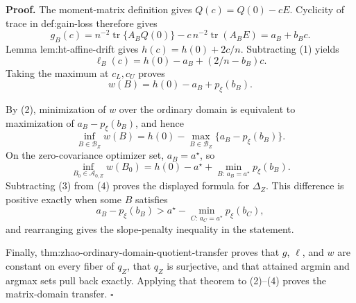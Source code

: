 \textbf{Proof.}
The moment-matrix definition gives \(Q(c)=Q(0)-cE\).  Cyclicity of trace in def:gain-loss therefore gives
\[
g_B(c)=n^{-2}\operatorname{tr}\{A_BQ(0)\}
-c\,n^{-2}\operatorname{tr}(A_BE)=a_B+b_Bc. \tag{1}
\]
Lemma lem:ht-affine-drift gives \(h(c)=h(0)+2c/n\).  Subtracting (1) yields
\[
\ell_B(c)=h(0)-a_B+(2/n-b_B)c.
\]
Taking the maximum at \(c_L,c_U\) proves
\[
w(B)=h(0)-a_B+p_\xi(b_B). \tag{2}
\]

By (2), minimization of \(w\) over the ordinary domain is equivalent to maximization of \(a_B-p_\xi(b_B)\), and hence
\[
\inf_{B\in\mathcal B_Z}w(B)
=h(0)-\max_{B\in\mathcal B_Z}\{a_B-p_\xi(b_B)\}. \tag{3}
\]
On the zero-covariance optimizer set, \(a_B=a^\star\), so
\[
\inf_{B_0\in\mathcal A_{0,Z}}w(B_0)
=h(0)-a^\star+\min_{B:\,a_B=a^\star}p_\xi(b_B). \tag{4}
\]
Subtracting (3) from (4) proves the displayed formula for \(\Delta_Z\).  This difference is positive exactly when some \(B\) satisfies
\[
a_B-p_\xi(b_B)>a^\star-\min_{C:\,a_C=a^\star}p_\xi(b_C),
\]
and rearranging gives the slope-penalty inequality in the statement.

Finally, thm:zhao-ordinary-domain-quotient-transfer proves that \(g\), \(\ell\), and \(w\) are constant on every fiber of \(q_Z\), that \(q_Z\) is surjective, and that attained argmin and argmax sets pull back exactly.  Applying that theorem to (2)--(4) proves the matrix-domain transfer. \(\square\)